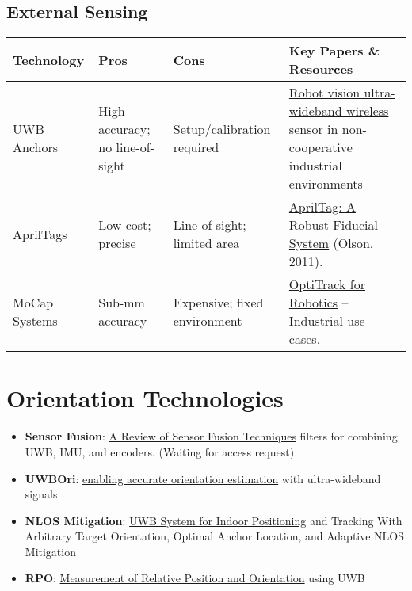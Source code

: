  
\subsection*{External Sensing}
\FloatBarrier

\begin{table}[H]
    \centering
    \begin{tabular}{|>{\raggedright\arraybackslash}p{3cm}|>{\raggedright\arraybackslash}p{3cm}|>{\raggedright\arraybackslash}p{3cm}|>{\raggedright\arraybackslash}p{5cm}|}
        \hline
        \textbf{Technology} & \textbf{Pros} & \textbf{Cons} & \textbf{Key Papers \& Resources} \\ \hline
        UWB Anchors & High accuracy; no line-of-sight & Setup/calibration required & \href{https://journals.sagepub.com/doi/full/10.1177/1729881418795767}{Robot vision ultra-wideband wireless sensor} in non-cooperative industrial environments  \\ \hline
        
        AprilTags & Low cost; precise & Line-of-sight; limited area & \href{https://april.eecs.umich.edu/papers/details.php?name=olson2011tags}{AprilTag: A Robust Fiducial System} (Olson, 2011). \\ \hline
        
        MoCap Systems & Sub-mm accuracy & Expensive; fixed environment & \href{https://www.naturalpoint.com/optitrack/applications/robotics/}{OptiTrack for Robotics} – Industrial use cases. \\ \hline
    \end{tabular}
\end{table}


\section*{Orientation Technologies}
\begin{itemize}
    \item \textbf{Sensor Fusion}: \href{https://www.researchgate.net/publication/356744906_Sensor_Fusion_for_Mobile_Robot_Localization_Using_Extended_Kalman_Filter_UWB_ToF_and_ArUco_Markers}{A Review of Sensor Fusion Techniques} filters for combining UWB, IMU, and encoders. (Waiting for access request)

    \item \textbf{UWBOri}:
    \href{https://hal.science/hal-04754129/}{enabling accurate orientation estimation} with ultra-wideband signals 

    \item \textbf{NLOS Mitigation}:
    \href{https://ieeexplore.ieee.org/abstract/document/8989827}{UWB System for Indoor Positioning} and Tracking With Arbitrary Target Orientation, Optimal Anchor Location, and Adaptive NLOS Mitigation

    \item \textbf{RPO}:
    \href{https://ieeexplore.ieee.org/abstract/document/8827149}{Measurement of Relative Position and Orientation} using UWB
\end{itemize}

